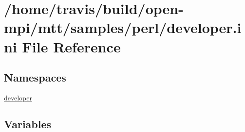 \hypertarget{developer_8ini}{\section{/home/travis/build/open-\/mpi/mtt/samples/perl/developer.ini File Reference}
\label{developer_8ini}
}
\subsection*{Namespaces}
\begin{DoxyCompactItemize}
\item 
\hyperlink{namespacedeveloper}{developer}
\end{DoxyCompactItemize}
\subsection*{Variables}
